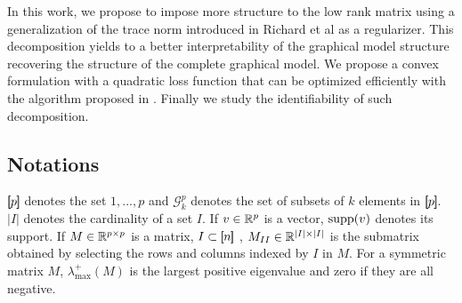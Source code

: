 In this work, we propose to impose more structure to the low rank matrix using a generalization of the trace norm introduced in Richard et al as a regularizer. This decomposition yields to a better interpretability of the graphical model structure recovering the structure of the complete graphical model. We propose a convex formulation with a quadratic loss function that can be optimized efficiently with the algorithm proposed in \citet{vinyes2017}.  Finally we study the identifiability of such decomposition. 

\subsection*{Notations}
$[\!\![p]\!\!]$ denotes the set ${1,...,p}$ and $\mathcal{G}^p_k$ denotes the
set of subsets of $k$ elements in $[\!\![p]\!\!]$. $|I|$ denotes the cardinality of a set $I$. If $v\in\mathbb{R}^{p}$ is a vector, $\text{supp}(v)$ denotes its support. If $M\in\mathbb{R}^{p\times p}$ is a matrix, $I\subset[\!\![n]\!\!]$ , $M_{II}\in\mathbb{R}^{|I|\times |I|}$ is the submatrix obtained by selecting the rows and columns indexed by $I$ in $M$. For a symmetric matrix $M$, $\lambda_{\max}^+(M)$ is the largest positive eigenvalue and zero if they are all negative.

%
